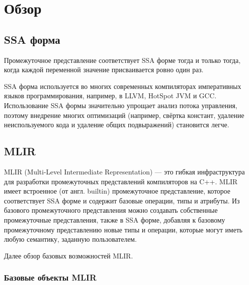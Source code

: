 
\section{Обзор}
\label{sec:relatedworks}

\subsection{SSA форма}

Промежуточное представление соответствует SSA \cite{SSA} форме тогда и только тогда, когда каждой переменной значение присваивается ровно один раз.

SSA форма используется во многих современных компиляторах императивных языков программирования, например, в LLVM, HotSpot JVM и GCC. Использование SSA формы значительно упрощает анализ потока управления, поэтому внедрение многих оптимизаций (например, свёртка констант, удаление неиспользуемого кода и удаление общих подвыражений) становится легче.

\subsection{MLIR}

MLIR \cite{MLIR} (Multi-Level Intermediate Representation) --- это гибкая инфраструктура для разработки промежуточных представлений компиляторов на C++. MLIR имеет встроенное (от англ. builtin) промежуточное представление, которое соответствует SSA форме и содержит базовые операции, типы и атрибуты. Из базового промежуточного представления можно создавать собственные промежуточные представления, также в SSA форме, добавляя к базовому промежуточному представлению новые типы и операции, которые могут иметь любую семантику, заданную пользователем.

Далее обзор базовых возможностей MLIR.

\subsubsection{Базовые объекты MLIR}


